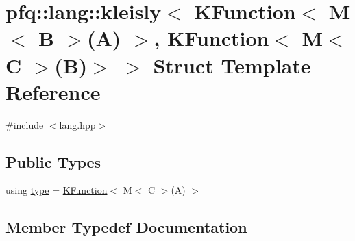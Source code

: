 \hypertarget{structpfq_1_1lang_1_1kleisly_3_01KFunction_3_01M_3_01B_01_4_07A_08_01_4_00_01KFunction_3_01M_3_01C_01_4_07B_08_4_01_4}{}\section{pfq\+:\+:lang\+:\+:kleisly$<$ K\+Function$<$ M$<$ B $>$(A) $>$, K\+Function$<$ M$<$ C $>$(B)$>$ $>$ Struct Template Reference}
\label{structpfq_1_1lang_1_1kleisly_3_01KFunction_3_01M_3_01B_01_4_07A_08_01_4_00_01KFunction_3_01M_3_01C_01_4_07B_08_4_01_4}


{\ttfamily \#include $<$lang.\+hpp$>$}

\subsection*{Public Types}
\begin{DoxyCompactItemize}
\item 
using \hyperlink{structpfq_1_1lang_1_1kleisly_3_01KFunction_3_01M_3_01B_01_4_07A_08_01_4_00_01KFunction_3_01M_3_01C_01_4_07B_08_4_01_4_a733eac3b86940e76816571e91cf26ea3}{type} = \hyperlink{structpfq_1_1lang_1_1KFunction}{K\+Function}$<$ M$<$ C $>$(A) $>$
\end{DoxyCompactItemize}


\subsection{Member Typedef Documentation}
\mbox{\label{structpfq_1_1lang_1_1kleisly_3_01KFunction_3_01M_3_01B_01_4_07A_08_01_4_00_01KFunction_3_01M_3_01C_01_4_07B_08_4_01_4_a733eac3b86940e76816571e91cf26ea3}} 
